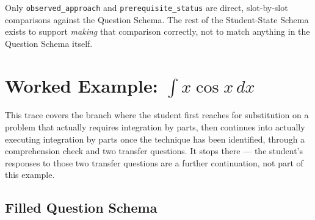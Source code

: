 \documentclass[11pt]{article}
\begin{document}
Only \texttt{observed\_approach} and \texttt{prerequisite\_status} are
direct, slot-by-slot comparisons against the Question Schema. The rest of
the Student-State Schema exists to support \emph{making} that comparison
correctly, not to match anything in the Question Schema itself.

\section{Worked Example: \texorpdfstring{$\int x \cos x \, dx$}{the integral of x cos x}}

This trace covers the branch where the student first reaches for
substitution on a problem that actually requires integration by parts, then
continues into actually executing integration by parts once the technique
has been identified, through a comprehension check and two transfer
questions. It stops there --- the student's responses to those two transfer
questions are a further continuation, not part of this example.

\subsection{Filled Question Schema}
\end{document}
